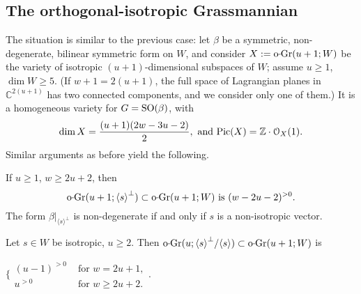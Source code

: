 \documentclass[11pt,reqno]{amsart}
\let\euf\EuScript
\let\mbb\mathbb
\let\nit\noindent
\let\lan\langle
\let\ran\rangle
\numberwithin{equation}{section}
\numberwithin{figure}{section}
\let\ges\geqslant
\begin{document}
\subsection{The orthogonal-isotropic Grassmannian}\label{ssct:o}

The situation is similar to the previous case: let $\beta$ be a symmetric, non-degenerate, 
bilinear symmetric form on $W$, and consider $X:={{\rm o{{{\vrule height2.75pt depth-2.35pt width2.3pt \kern1.7pt}}\!}Gr}}(u+1;W)$ be the variety of 
isotropic $(u+1)$-dimensional subspaces of $W$; assume $u\ges 1$, $\dim W\ges 5$. 
(If $w+1=2(u+1)$, the full space of Lagrangian planes in ${{\mbb C}}^{2(u+1)}$ 
has two connected components, and we consider only one of them.) 
It is a homogeneous variety for $G={{\rm SO}}(\beta)$, with 
$$
\dim X=\frac{(u+1)(2w-3u-2)}{2},\text{ and }{\mathop{\rm Pic}\nolimits}(X)=\mbb Z\cdot{{\euf O}}_X(1). 
$$ 
Similar arguments as before yield the following.

\begin{m-lemma}\label{lm:o-p-pos}
\nit{\rm(i)} If $u\ges 1$, $w\ges 2u+2$, then 
$$
{{\rm o{{{\vrule height2.75pt depth-2.35pt width2.3pt \kern1.7pt}}\!}Gr}}(u+1;{{\lan {s}\ran}}^\perp)\subset{{\rm o{{{\vrule height2.75pt depth-2.35pt width2.3pt \kern1.7pt}}\!}Gr}}(u+1;W)\text{ is }(w-2u-2)^{{>0}}. 
$$
The form $\beta|_{{{\lan {s}\ran}}^\perp}$ is non-degenerate if and only if 
$s$ is a non-isotropic vector.

\nit{\rm(ii)} 
Let $s\in W$ be isotropic, $u\ges 2$. Then 
${{\rm o{{{\vrule height2.75pt depth-2.35pt width2.3pt \kern1.7pt}}\!}Gr}}(u;{{\lan {s}\ran}}^\perp/{{\lan {s}\ran}})\subset{{\rm o{{{\vrule height2.75pt depth-2.35pt width2.3pt \kern1.7pt}}\!}Gr}}(u+1;W)$ is 
\\[1ex] \centerline{
$\biggl\{\begin{array}{cl}
(u-1)^{{>0}}&\text{ for }w=2u+1,
\\[1ex] 
u^{{>0}}&\text{ for }w\ges2u+2.
\end{array}\biggr.$
}
\end{m-lemma}
\end{document}
